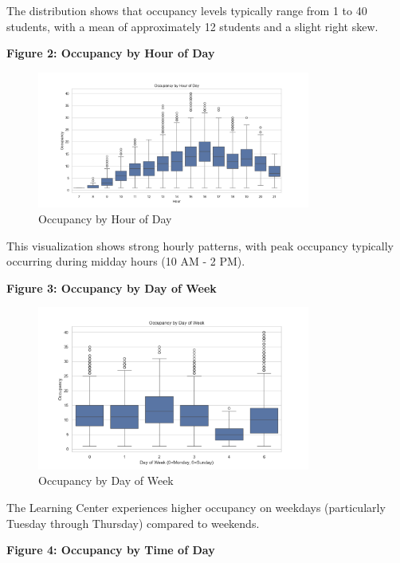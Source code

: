 \documentclass[12pt,letterpaper]{article}
\begin{document}
The distribution shows that occupancy levels typically range from 1 to 40 students, with a mean of approximately 12 students and a slight right skew.

\textbf{Figure 2: Occupancy by Hour of Day}

\begin{figure}[H]
    \centering
    \includegraphics[width=0.8\textwidth]{occupancy_prediction/visualizations/occupancy_by_hour.png}
    \caption{Occupancy by Hour of Day}
\end{figure}

This visualization shows strong hourly patterns, with peak occupancy typically occurring during midday hours (10 AM - 2 PM).

\textbf{Figure 3: Occupancy by Day of Week}

\begin{figure}[H]
    \centering
    \includegraphics[width=0.8\textwidth]{occupancy_prediction/visualizations/occupancy_by_day.png}
    \caption{Occupancy by Day of Week}
\end{figure}

The Learning Center experiences higher occupancy on weekdays (particularly Tuesday through Thursday) compared to weekends.

\textbf{Figure 4: Occupancy by Time of Day}
\end{document}
